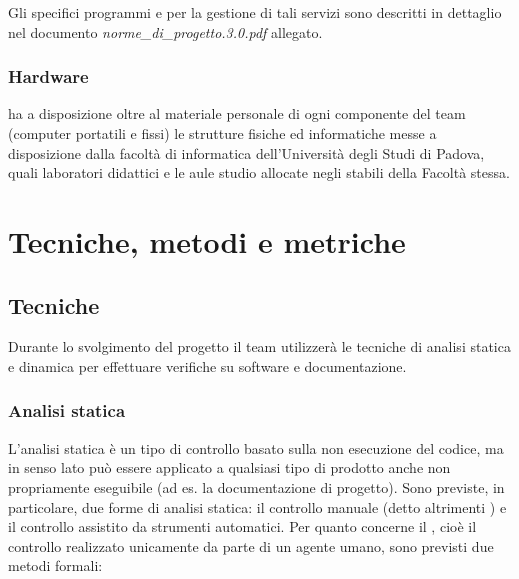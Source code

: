 Gli specifici programmi e  per la gestione di tali servizi sono descritti in dettaglio nel documento \textit{norme\_di\_progetto.3.0.pdf} allegato.

\subsubsection{Hardware}
\team{} ha a disposizione oltre al materiale personale di ogni componente del team (computer portatili e fissi) le strutture fisiche ed informatiche messe a disposizione dalla facoltà di informatica dell'Università degli Studi di Padova, quali laboratori didattici e le aule studio allocate negli stabili della Facoltà stessa.
\clearpage


\section{Tecniche, metodi e metriche}

\subsection{Tecniche}
Durante lo svolgimento del progetto il team utilizzerà le tecniche di analisi statica e dinamica per effettuare verifiche su software e documentazione.

\subsubsection{Analisi statica} 
L’analisi statica è un tipo di controllo basato sulla non esecuzione del codice, ma in senso lato può essere applicato a qualsiasi tipo di prodotto anche non propriamente eseguibile (ad es. la documentazione di progetto). Sono previste, in particolare, due forme di analisi statica: il controllo manuale (detto altrimenti ) e il controllo assistito da strumenti automatici.
Per quanto concerne il , cioè il controllo realizzato unicamente da parte di un agente umano, sono previsti due metodi formali:

